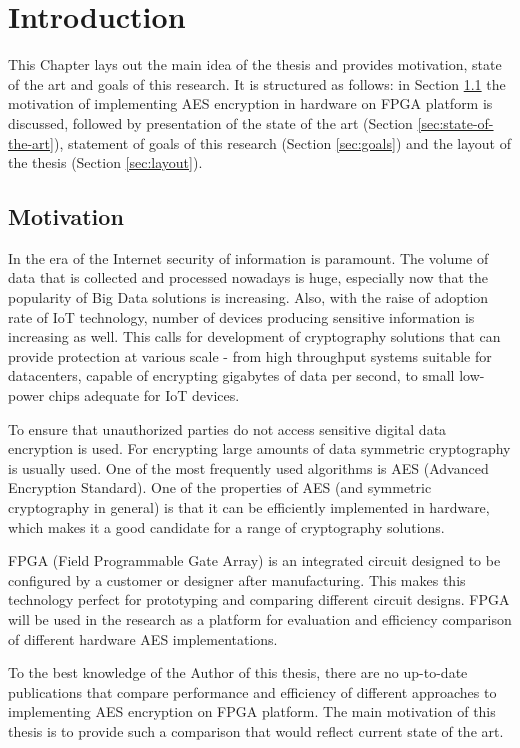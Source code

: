 \section{Introduction}
This Chapter lays out the main idea of the thesis and provides motivation, state of the art and goals of this research. It is structured as follows: in Section \ref{sec:motivation} the motivation of implementing AES encryption in hardware on FPGA platform is discussed, followed by presentation of the state of the art (Section \ref{sec:state-of-the-art}), statement of goals of this research (Section \ref{sec:goals}) and the layout of the thesis (Section \ref{sec:layout}).

\subsection{Motivation}
\label{sec:motivation}
In the era of the Internet security of information is paramount. The volume of data that is collected and processed nowadays is huge, especially now that the popularity of Big Data solutions is increasing. Also, with the raise of adoption rate of IoT technology, number of devices producing sensitive information is increasing as well. This calls for development of cryptography solutions that can provide protection at various scale - from high throughput systems suitable for datacenters, capable of encrypting gigabytes of data per second, to small low-power chips adequate for IoT devices.

To ensure that unauthorized parties do not access sensitive digital data encryption is used. For encrypting large amounts of data symmetric cryptography is usually used. One of the most frequently used algorithms is AES (Advanced Encryption Standard). One of the properties of AES (and symmetric cryptography in general) is that it can be efficiently implemented in hardware, which makes it a good candidate for a range of cryptography solutions.

FPGA (Field Programmable Gate Array) is an integrated circuit designed to be configured by a customer or designer after manufacturing. This makes this technology perfect for prototyping and comparing different circuit designs. FPGA will be used in the research as a platform for evaluation and efficiency comparison of different hardware AES implementations.

To the best knowledge of the Author of this thesis, there are no up-to-date publications that compare performance and efficiency of different approaches to implementing AES encryption on FPGA platform. The main motivation of this thesis is to provide such a comparison that would reflect current state of the art.

